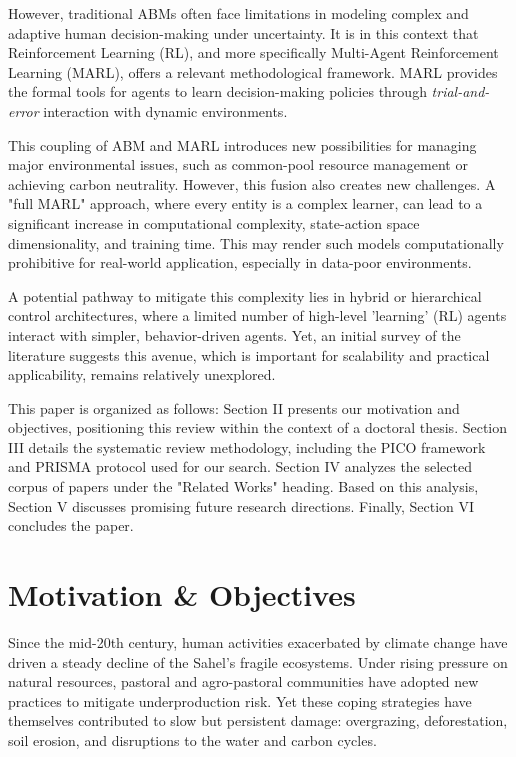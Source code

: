 \documentclass[conference]{IEEEtran}
\begin{document}
However, traditional ABMs often face limitations in modeling complex and adaptive human decision-making under uncertainty. It is in this context that Reinforcement Learning (RL), and more specifically Multi-Agent Reinforcement Learning (MARL), offers a relevant methodological framework. MARL provides the formal tools for agents to learn decision-making policies through \textit{trial-and-error} interaction with dynamic environments.

This coupling of ABM and MARL introduces new possibilities for managing major environmental issues, such as common-pool resource management or achieving carbon neutrality. However, this fusion also creates new challenges. A "full MARL" approach, where every entity is a complex learner, can lead to a significant increase in computational complexity, state-action space dimensionality, and training time. This may render such models computationally prohibitive for real-world application, especially in data-poor environments.

A potential pathway to mitigate this complexity lies in hybrid or hierarchical control architectures, where a limited number of high-level 'learning' (RL) agents interact with simpler, behavior-driven agents. Yet, an initial survey of the literature suggests this avenue, which is important for scalability and practical applicability, remains relatively unexplored.

This paper is organized as follows: Section II presents our motivation and objectives, positioning this review within the context of a doctoral thesis. Section III details the systematic review methodology, including the PICO framework and PRISMA protocol used for our search. Section IV analyzes the selected corpus of papers under the "Related Works" heading. Based on this analysis, Section V discusses promising future research directions. Finally, Section VI concludes the paper.

\section*{Motivation \& Objectives}

Since the mid-20th century, human activities exacerbated by climate change have driven a steady decline of the Sahel’s fragile ecosystems. Under rising pressure on natural resources, pastoral and agro-pastoral communities have adopted new practices to mitigate underproduction risk. Yet these coping strategies have themselves contributed to slow but persistent damage: overgrazing, deforestation, soil erosion, and disruptions to the water and carbon cycles.
\end{document}
